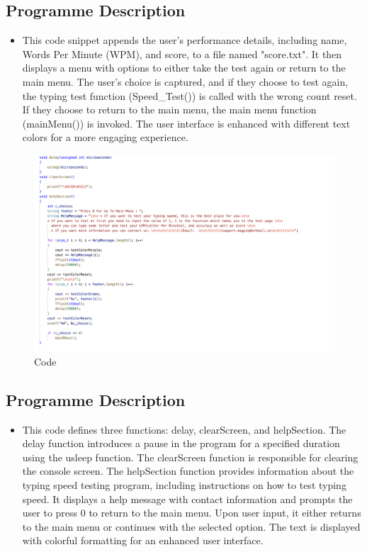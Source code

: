 \subsection{Programme Description}
    \begin{itemize}
        \item This code snippet appends the user's performance details, including name, Words Per Minute (WPM), and score, to a file named "score.txt". It then displays a menu with options to either take the test again or return to the main menu. The user's choice is captured, and if they choose to test again, the typing test function (Speed\_Test()) is called with the wrong count reset. If they choose to return to the main menu, the main menu function (mainMenu()) is invoked. The user interface is enhanced with different text colors for a more engaging experience.
    \end{itemize}
\newpage
\begin{figure}[h]
     \includegraphics[scale=0.25]{CodeScreenShot/help-1.png}
    \caption{Code}
    \label{fig:code-screenshots}
\end{figure}

\subsection{Programme Description}
    \begin{itemize}
        \item This code defines three functions: delay, clearScreen, and helpSection. The delay function introduces a pause in the program for a specified duration using the usleep function. The clearScreen function is responsible for clearing the console screen. The helpSection function provides information about the typing speed testing program, including instructions on how to test typing speed. It displays a help message with contact information and prompts the user to press 0 to return to the main menu. Upon user input, it either returns to the main menu or continues with the selected option. The text is displayed with colorful formatting for an enhanced user interface.
    \end{itemize}
\newpage


